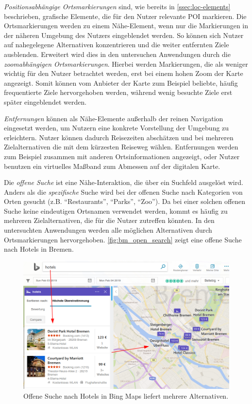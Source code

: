 \emph{Positionsabhängige Ortsmarkierungen} sind, wie bereits in \autoref{ssec:loc-elements} beschrieben, grafische Elemente, die für den Nutzer relevante POI markieren.
Die Ortsmarkierungen werden zu einem Nähe-Element, wenn nur die Markierungen in der näheren Umgebung des Nutzers eingeblendet werden.
So können sich Nutzer auf nahegelegene Alternativen konzentrieren und die weiter entfernten Ziele ausblenden.
Erweitert wird dies in den untersuchen Anwendungen durch die \emph{zoomabhängigen Ortsmarkierungen}.
Hierbei werden Markierungen, die als weniger wichtig für den Nutzer betrachtet werden, erst bei einem hohen Zoom der Karte angezeigt.
Somit können vom Anbieter der Karte zum Beispiel beliebte, häufig frequentierte Ziele hervorgehoben werden, während wenig besuchte Ziele erst später eingeblendet werden.

\emph{Entfernungen} können als Nähe-Elemente außerhalb der reinen Navigation eingesetzt werden, um Nutzern eine konkrete Vorstellung der Umgebung zu erleichtern.
Nutzer können dadurch Reisezeiten abschätzen und bei mehreren Zielalternativen die mit dem kürzesten Reiseweg wählen.
Entfernungen werden zum Beispiel zusammen mit anderen Ortsinformationen angezeigt, oder Nutzer benutzen ein virtuelles Maßband zum Abmessen auf der digitalen Karte.

Die \emph{offene Suche} ist eine Nähe-Interaktion, die über ein Suchfeld ausgelöst wird.
Anders als die \emph{spezifische} Suche wird bei der offenen Suche nach Kategorien von Orten gesucht (z.B. \enquote{Restaurants}, \enquote{Parks}, \enquote{Zoo}).
Da bei einer solchen offenen Suche keine eindeutigen Ortsnamen verwendet werden, kommt es häufig zu mehreren Zielalternativen, die für die Nutzer zutreffen könnten.
In den untersuchten Anwendungen werden alle möglichen Alternativen durch Ortsmarkierungen hervorgehoben.
\autoref{fig:bm_open_search} zeigt eine offene Suche nach Hotels in Bremen.
\begin{figure}[h]
	\includegraphics[width=\linewidth]{figures/map-app_examples/bm_open_search_2}
	\caption{Offene Suche nach Hotels in Bing Maps liefert mehrere Alternativen.}
	\label{fig:bm_open_search}
\end{figure}

